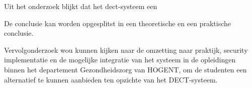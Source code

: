 Uit het onderzoek blijkt dat het \gls{dect}-systeem een  

De conclusie kan worden opgesplitst in een theoretische en een praktische conclusie. 


Vervolgonderzoek wou kunnen kijken naar de omzetting naar praktijk, security implementatie en de mogelijke integratie van het systeem in de opleidingen binnen het departement Gezondheidszorg van HOGENT, om de studenten een alternatief te kunnen aanbieden ten opzichte van het DECT-systeem.









